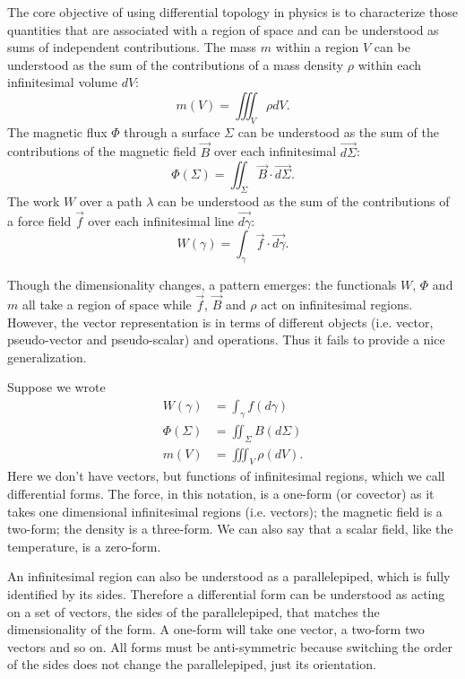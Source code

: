 \documentclass[10pt,twocolumn, nofootinbib]{revtex4-2}
\begin{document}
The core objective of using differential topology in physics is to characterize those quantities that are associated with a region of space and can be understood as sums of independent contributions. The mass $m$ within a region $V$ can be understood as the sum of the contributions of a mass density $\rho$ within each infinitesimal volume $dV$:
\begin{equation*}
	m(V) = \iiint_V \rho dV.
\end{equation*}
The magnetic flux $\Phi$ through a surface $\Sigma$ can be understood as the sum of the contributions of the magnetic field $\vec{B}$ over each infinitesimal $\vec{d\Sigma}$:
\begin{equation*}
	\Phi(\Sigma) = \iint_\Sigma \vec{B} \cdot \vec{d\Sigma}.
\end{equation*}
The work $W$ over a path $\lambda$ can be understood as the sum of the contributions of a force field $\vec{f}$ over each infinitesimal line $\vec{d\gamma}$:
\begin{equation*}
	W(\gamma) = \int_\gamma \vec{f} \cdot \vec{d\gamma}.
\end{equation*}

Though the dimensionality changes, a pattern emerges: the functionals $W$, $\Phi$ and $m$ all take a region of space while $\vec{f}$, $\vec{B}$ and $\rho$ act on infinitesimal regions. However, the vector representation is in terms of different objects (i.e. vector, pseudo-vector and pseudo-scalar) and operations. Thus it fails to provide a nice generalization.

Suppose we wrote
\begin{equation*}
\begin{aligned}
	W(\gamma) &= \int_\gamma f(d\gamma) \\
	\Phi(\Sigma) &= \iint_\Sigma B(d\Sigma) \\
	m(V) &= \iiint_V \rho(dV).
\end{aligned}
\end{equation*}
Here we don't have vectors, but functions of infinitesimal regions, which we call differential forms. The force, in this notation, is a one-form (or covector) as it takes one dimensional infinitesimal regions (i.e. vectors); the magnetic field is a two-form; the density is a three-form. We can also say that a scalar field, like the temperature, is a zero-form.

An infinitesimal region can also be understood as a parallelepiped, which is fully identified by its sides. Therefore a differential form can be understood as acting on a set of vectors, the sides of the parallelepiped, that matches the dimensionality of the form. A one-form will take one vector, a two-form two vectors and so on. All forms must be anti-symmetric because switching the order of the sides does not change the parallelepiped, just its orientation.
\end{document}
